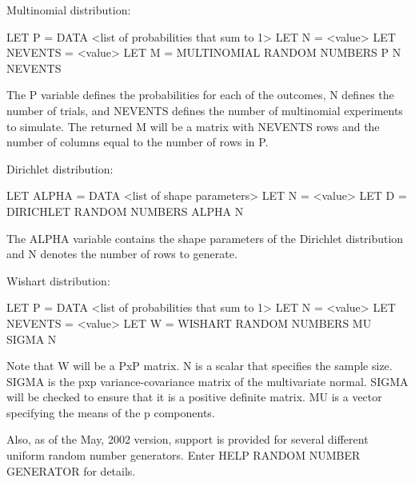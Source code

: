 Multinomial distribution:

   LET P = DATA <list of probabilities that sum to 1>
   LET N = <value>
   LET NEVENTS = <value>
   LET M = MULTINOMIAL RANDOM NUMBERS P N NEVENTS

   The P variable defines the probabilities for each of the
   outcomes, N defines the number of trials, and NEVENTS
   defines the number of multinomial experiments to simulate.
   The returned M will be a matrix with NEVENTS rows and
   the number of columns equal to the number of rows in P.

Dirichlet distribution:

   LET ALPHA = DATA <list of shape parameters>
   LET N = <value>
   LET D = DIRICHLET RANDOM NUMBERS ALPHA N

   The ALPHA variable contains the shape parameters of the
   Dirichlet distribution and N denotes the number of rows to
   generate.

Wishart distribution:

   LET P = DATA <list of probabilities that sum to 1>
   LET N = <value>
   LET NEVENTS = <value>
   LET W = WISHART RANDOM NUMBERS MU SIGMA N

   Note that W will be a PxP matrix.  N is a scalar that specifies
   the sample size.  SIGMA is the pxp variance-covariance
   matrix of the multivariate normal.  SIGMA will be checked to
   ensure that it is a positive definite matrix.  MU is a vector
   specifying the means of the p components.


Also, as of the May, 2002 version, support is provided for several
different uniform random number generators.  Enter
HELP RANDOM NUMBER GENERATOR for details.

